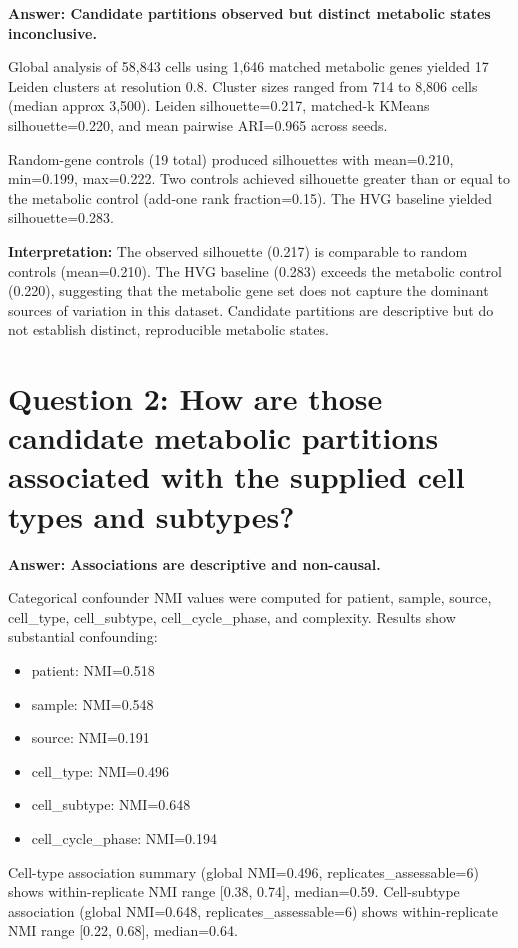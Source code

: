 \documentclass[11pt, a4paper]{article}
\begin{document}
\textbf{Answer: Candidate partitions observed but distinct metabolic states inconclusive.}

Global analysis of 58,843 cells using 1,646 matched metabolic genes yielded 17 Leiden clusters at resolution 0.8. Cluster sizes ranged from 714 to 8,806 cells (median approx 3,500). Leiden silhouette=0.217, matched-k KMeans silhouette=0.220, and mean pairwise ARI=0.965 across seeds.

Random-gene controls (19 total) produced silhouettes with mean=0.210, min=0.199, max=0.222. Two controls achieved silhouette greater than or equal to the metabolic control (add-one rank fraction=0.15). The HVG baseline yielded silhouette=0.283.

\textbf{Interpretation:} The observed silhouette (0.217) is comparable to random controls (mean=0.210). The HVG baseline (0.283) exceeds the metabolic control (0.220), suggesting that the metabolic gene set does not capture the dominant sources of variation in this dataset. Candidate partitions are descriptive but do not establish distinct, reproducible metabolic states.

\section{Question 2: How are those candidate metabolic partitions associated with the supplied cell types and subtypes?}

\textbf{Answer: Associations are descriptive and non-causal.}

Categorical confounder NMI values were computed for patient, sample, source, cell\_type, cell\_subtype, cell\_cycle\_phase, and complexity. Results show substantial confounding:
\begin{itemize}
    \item patient: NMI=0.518
    \item sample: NMI=0.548
    \item source: NMI=0.191
    \item cell\_type: NMI=0.496
    \item cell\_subtype: NMI=0.648
    \item cell\_cycle\_phase: NMI=0.194
\end{itemize}

Cell-type association summary (global NMI=0.496, replicates\_assessable=6) shows within-replicate NMI range [0.38, 0.74], median=0.59. Cell-subtype association (global NMI=0.648, replicates\_assessable=6) shows within-replicate NMI range [0.22, 0.68], median=0.64.
\end{document}
